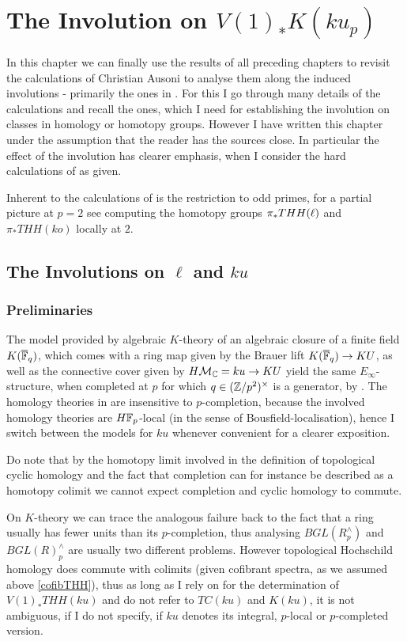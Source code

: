 \chapter{The Involution on $V(1)_*K(ku_p)$}\label{calc}
In this chapter we can finally use the results of all preceding
chapters to revisit the calculations of Christian Ausoni to analyse
them along the induced involutions - primarily the ones in \cite{AuTHH,AuKku}. 
For this I go through many details of the 
calculations and recall the ones, which I need for establishing
the involution on classes in homology or homotopy groups. However
I have written this chapter under the assumption that the reader
has the sources \cite{AuTHH,AuKku} close.
In particular the effect of the involution has clearer emphasis,
when I consider the hard calculations of \cite{AuTHH,AuKku} as given.

Inherent to the calculations of \cite{AuTHH,AuKku} is the restriction to
odd primes, for a partial picture at $p=2$ see \cite{AnHL} computing the
homotopy groups $\pi_*THH(\ell)$ and $\pi_*THH(ko)$ locally at $2$.

\section{The Involutions on $\ell$ and $ku$}
\subsection*{Preliminaries}
The model provided by algebraic 
$K$-theory of an algebraic closure of a finite field $K(\overline{\mathbb{F}}_q)$,
which comes with a ring map given by the Brauer lift $K(\overline{\mathbb{F}}_q)
\rightarrow KU$, as well as the connective cover given by $H\mathcal{M}_{\mathbb{C}}
=ku\rightarrow KU$ yield the same $E_\infty$-structure, when 
completed at $p$ for which $q\in(\mathbb{Z}/p^2)^\times$ is a generator, by
\cite{BaRi08}. 
The homology theories in \cite{AuTHH,AuKku} are insensitive to 
$p$-completion, because the involved homology theories are 
$H\mathbb{F}_p$-local (in the sense of Bousfield-localisation), hence I
switch between the models for $ku$ whenever convenient for a 
clearer exposition. 

Do note that by the homotopy limit involved in the definition of 
topological cyclic homology and the fact that completion can for instance
be described as a homotopy colimit we cannot expect 
completion and cyclic homology to commute. 

On $K$-theory we can
trace the analogous failure back to the fact that a ring usually
has fewer units than its $p$-completion, thus analysing $BGL(R_p^{\wedge})$
and $BGL(R)_p^{\wedge}$ are usually two different problems. However 
topological Hochschild homology does commute with colimits (given
cofibrant spectra, as we assumed above \ref{cofibTHH}), thus as long as
I rely on \cite{AuTHH} for the determination of $V(1)_*THH(ku)$ and do
not refer to $TC(ku)$ and $K(ku)$, it is not ambiguous, if I do not
specify, if $ku$ denotes its integral, $p$-local or $p$-completed 
version.

